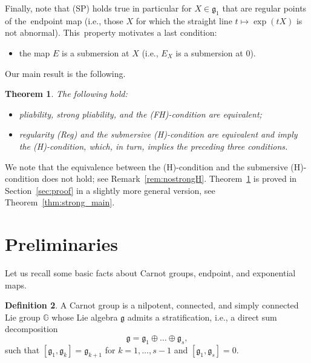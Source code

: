 \documentclass[pdftex]{sigma}
\numberwithin{equation}{section}
\newtheorem{Theorem}{Theorem}[section]
\theoremstyle{definition}
\newtheorem{Definition}[Theorem]{Definition}
\begin{document}
Finally, note that (SP) holds true in particular for $X\in{\mathfrak g}_1$ that are regular points of the~endpoint map
(i.e., those $X$ for which the straight line $t \mapsto \exp (tX)$ is not abnormal). This~property motivates a last condition:
\begin{itemize}\itemsep=0pt\setlength{\leftskip}{0.15cm}
 \item[(Reg)] the map $E$ is a submersion at $X$ (i.e., $E_X$ is a submersion at $0$).
\end{itemize}

Our main result is the following.

\begin{Theorem}\label{thm:main} The following hold:
\begin{itemize}\itemsep=0pt
 \item pliability, strong pliability,
 and the {\rm (FH)}-condition are equivalent;
 \item regularity {\rm (Reg)} and the submersive {\rm (H)}-condition are equivalent and imply the {\rm (H)}-con\-di\-tion, which, in turn, implies
 the preceding three conditions.
\end{itemize}
\end{Theorem}

We note that the equivalence between the (H)-condition and the submersive (H)-condition does not hold; see Remark~\ref{rem:nostrongH}.
Theorem~\ref{thm:main} is proved in Section~\ref{sec:proof} in a slightly more general version, see Theorem~\ref{thm:strong_main}.

\section{Preliminaries}

Let us recall some basic facts about Carnot groups, endpoint, and exponential maps.

\begin{Definition}\label{def:carnotgp}
 A Carnot group is a nilpotent, connected, and simply connected Lie group $\mathbb{G}$ whose Lie algebra ${\mathfrak g}$ admits a stratification, i.e., a direct sum decomposition{\samepage
 \begin{equation*}
 {\mathfrak g}={\mathfrak g}_1\oplus \dots \oplus {\mathfrak g}_s,
 \end{equation*}
 such that $[{\mathfrak g}_1,{\mathfrak g}_k]=
 {\mathfrak g}_{k+1}$ for $k=1,\dots,s-1$ and $[{\mathfrak g}_1,{\mathfrak g}_s]=0$.}
\end{Definition}
\end{document}
